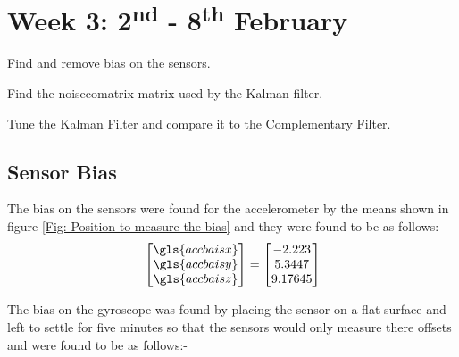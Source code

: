 \chapter{Week 3: 2\textsuperscript{nd} - 8\textsuperscript{th} February }
\begin{itemize*}
	\item Find and remove bias on the sensors.
	\item Find the \gls{noisecomatrix} matrix used by the Kalman filter.
	\item Tune the Kalman Filter and compare it to the Complementary Filter. 
\end{itemize*}
	
	 \tocless\section{Sensor Bias}
	The bias on the sensors were found for the accelerometer by the means shown in figure \ref{Fig: Position to measure the bias} and they were found to be as follows:-
		\begin{equation}
		\begin{bmatrix}
		\gls{accbaisx}\\ \gls{accbaisy}\\\gls{accbaisz}
		\end{bmatrix} 
		=
		\begin{bmatrix}
		-2.223\\ 5.3447  \\9.17645
		\end{bmatrix}
		\end{equation}
		
		The bias on the gyroscope was found by placing the sensor on a flat surface and left to settle for five minutes so that the sensors would only measure there offsets and were found to be as follows:-
		
